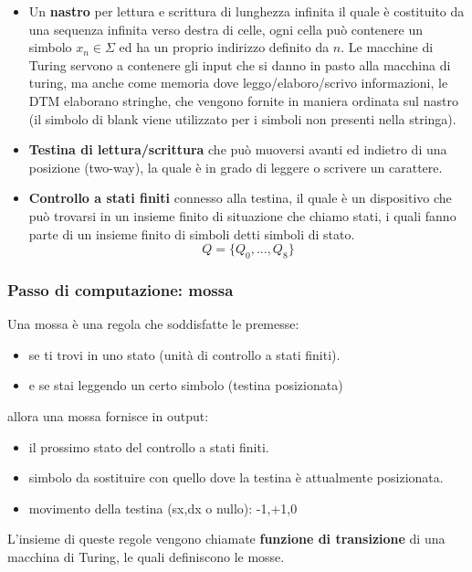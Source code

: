 \documentclass{article}
\begin{document}
\begin{itemize}
    \item Un \textbf{nastro} per lettura e scrittura di lunghezza infinita il quale è costituito
    da una sequenza infinita verso destra di celle, ogni cella può contenere un simbolo $x_n\in\Sigma$ ed
    ha un proprio indirizzo definito da $n$. Le macchine di Turing servono a contenere gli input
    che si danno in pasto alla macchina di turing, ma anche come memoria dove leggo/elaboro/scrivo
    informazioni, le DTM elaborano stringhe, che vengono fornite in maniera ordinata
    sul nastro (il simbolo di blank viene utilizzato per i simboli non presenti nella stringa).

    \item \textbf{Testina di lettura/scrittura} che può muoversi avanti ed indietro di una posizione (two-way),
    la quale è in grado di leggere o scrivere un carattere.
    \item \textbf{Controllo a stati finiti} connesso alla testina, il quale è un dispositivo che può trovarsi
    in un insieme finito di situazione che chiamo stati, i quali fanno parte di un insieme finito di simboli
    detti simboli di stato.
    $$Q=\{Q_0,\dots,Q_8\}$$
\end{itemize}

\subsubsection{Passo di computazione: mossa}
Una mossa è una regola che soddisfatte le premesse:
\begin{itemize}
    \item se ti trovi in uno stato (unità di
controllo a stati finiti).
\item e se stai leggendo un
certo simbolo (testina posizionata)
\end{itemize}
allora una mossa fornisce in output:
\begin{itemize}
    \item il prossimo stato del controllo a stati finiti.
    \item simbolo da sostituire con quello dove la testina è attualmente posizionata.
    \item movimento della testina (sx,dx o nullo): -1,+1,0
\end{itemize}
L'insieme di queste regole vengono chiamate \textbf{funzione di transizione} di una
macchina di Turing, le quali definiscono le mosse.
\end{document}
